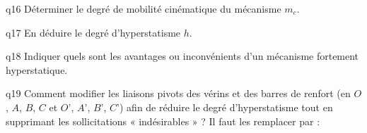 \begin{multicols}{2}
{\begin{question}{q16}
Déterminer le degré de mobilité cinématique du mécanisme $m_c$.
\ifprof
\begin{corrige}
\end{corrige}
\else
\fi
\begin{reponses}
\end{reponses} \end{question}}  


{\begin{question}{q17}
En déduire le degré d'hyperstatisme $h$.
\ifprof
\begin{corrige}
\end{corrige}
\else
\fi
\begin{reponses}
\end{reponses} \end{question}}  



{\begin{question}{q18}
Indiquer quels sont les avantages ou inconvénients d’un mécanisme fortement
hyperstatique.
\ifprof
\begin{corrige}
\end{corrige}
\else
\fi
\begin{reponses}


\end{reponses} \end{question}}  




{\begin{question}{q19}
Comment modifier les liaisons pivots des vérins et des barres de renfort (en $O$, $A$, $B$, $C$ et
$O’$, $A’$, $B’$, $C’$) afin de réduire le degré d’hyperstatisme tout en supprimant les sollicitations
« indésirables »  ? Il faut les remplacer par :
\ifprof
\begin{corrige}
\end{corrige}
\else
\fi
\begin{reponses}
\end{reponses} \end{question}}  


\end{multicols}
